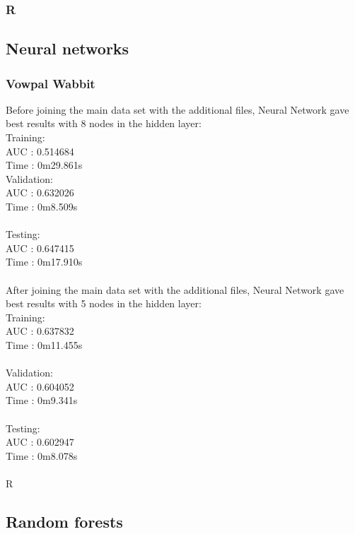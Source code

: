 \documentclass[10pt]{article}
\begin{document}
\subsubsection{R}

\subsection{Neural networks}
\subsubsection{Vowpal Wabbit}
Before joining the main data set with the additional files, Neural Network gave best results with 8 nodes in the hidden layer:\\

Training:\\
AUC  : 0.514684\\
Time : 0m29.861s\\

Validation:\\
AUC  : 0.632026\\
Time : 0m8.509s\\\\

Testing:\\
AUC  : 0.647415\\
Time : 0m17.910s\\\\

After joining the main data set with the additional files, Neural Network gave best results with 5 nodes in the hidden layer:\\

Training:\\
AUC  : 0.637832\\
Time : 0m11.455s\\\\

Validation:\\
AUC  : 0.604052\\
Time : 0m9.341s\\\\

Testing:\\
AUC  : 0.602947\\
Time : 0m8.078s\\\\
R\\

\subsection{Random forests}
\end{document}
